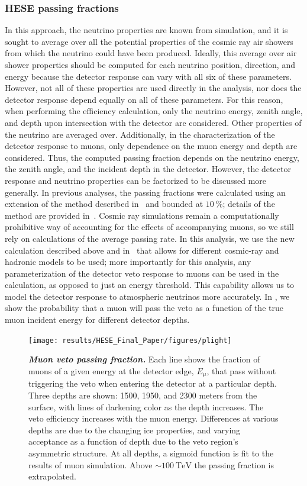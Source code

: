 \subsubsection{HESE passing fractions\label{sec:hese_passingfractions}}
In this approach, the neutrino properties are known from simulation, and it is sought to average over all the potential properties of the cosmic ray air showers from which the neutrino could have been produced.
Ideally, this average over air shower properties should be computed for each neutrino position, direction, and energy because the detector response can vary with all six of these parameters.
However, not all of these properties are used directly in the analysis, nor does the detector response depend equally on all of these parameters.
For this reason, when performing the efficiency calculation, only the neutrino energy, zenith angle, and depth upon intersection with the detector are considered.
Other properties of the neutrino are averaged over.
Additionally, in the characterization of the detector response to muons, only dependence on the muon energy and depth are considered.
Thus, the computed passing fraction depends on the neutrino energy, the zenith angle, and the incident depth in the detector.
However, the detector response and neutrino properties can be factorized to be discussed more generally.
In previous analyses, the passing fractions were calculated using an extension of the method described in~\cite{Schonert:2008is} and bounded at $\SI{10}\percent$; details of the method are provided in~\cite{Aartsen:2013jdh}.
Cosmic ray simulations remain a computationally prohibitive way of accounting for the effects of accompanying muons, so we still rely on calculations of the average passing rate.
In this analysis, we use the new calculation described above and in~\cite{Arguelles:2018awr} that allows for different cosmic-ray and hadronic models to be used; more importantly for this analysis, any parameterization of the detector veto response to muons can be used in the calculation, as opposed to just an energy threshold.
This capability allows us to model the detector response to atmospheric neutrinos more accurately.
In , we show the probability that a muon will pass the veto as a function of the true muon incident energy for different detector depths.

\begin{figure}
	\centering
	\texttt{[image: results/HESE\_Final\_Paper/figures/plight]}
	\caption{\textbf{\textit{Muon veto passing fraction.}} Each line shows the fraction of muons of a given energy at the detector edge, $E_\mu$, that pass without triggering the veto when entering the detector at a particular depth.
		Three depths are shown: 1500, 1950, and 2300 meters from the surface, with lines of darkening color as the depth increases.
		The veto efficiency increases with the muon energy.
		Differences at various depths are due to the changing ice properties, and varying acceptance as a function of depth due to the veto region's asymmetric structure.
		At all depths, a sigmoid function is fit to the results of muon simulation.
		Above $\sim\SI{100}\TeV$ the passing fraction is extrapolated.}\label{fig:P_light}
\end{figure}

